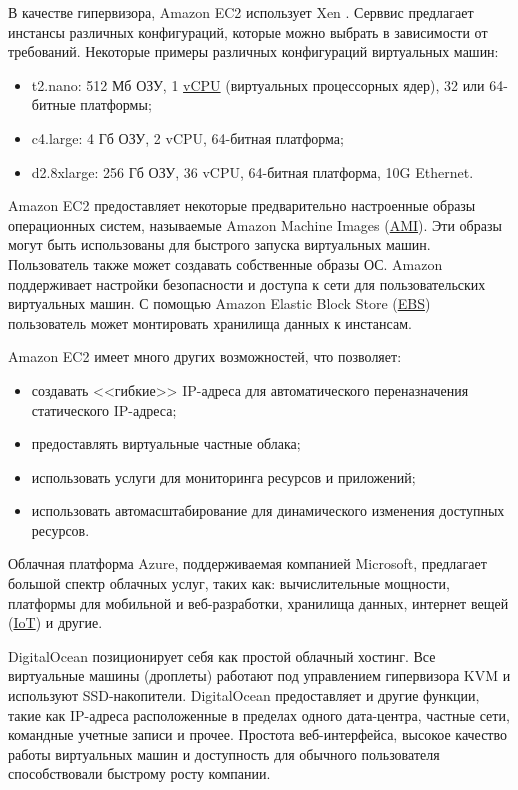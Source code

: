 
В качестве гипервизора, Amazon EC2 использует Xen \cite{xen}.
Серввис предлагает инстансы различных конфигураций, которые можно выбрать в зависимости от требований.
Некоторые примеры различных конфигураций виртуальных машин:
\begin{itemize}
  \item t2.nano: 512 Мб ОЗУ, 1 \hyperlink{vcpu}{vCPU} (виртуальных процессорных ядер), 32 или 64-битные платформы;
  \item c4.large: 4 Гб ОЗУ, 2 vCPU, 64-битная платформа;
  \item d2.8xlarge: 256 Гб ОЗУ, 36 vCPU, 64-битная платформа, 10G Ethernet.
\end{itemize}

Amazon EC2 предоставляет некоторые предварительно настроенные образы операционных систем, называемые Amazon Machine Images (\hyperlink{ami}{AMI}).
Эти образы могут быть использованы для быстрого запуска виртуальных машин.
Пользователь также может создавать собственные образы ОС.
Amazon поддерживает настройки безопасности и доступа к сети для пользовательских виртуальных машин.
С помощью Amazon Elastic Block Store (\hyperlink{ebs}{EBS}) пользователь может монтировать хранилища данных к инстансам.

Amazon EC2 имеет много других возможностей, что позволяет:
\begin{itemize}
  \item создавать <<гибкие>> IP-адреса для автоматического переназначения статического IP-адреса;
  \item предоставлять виртуальные частные облака;
  \item использовать услуги для мониторинга ресурсов и приложений;
  \item использовать автомасштабирование для динамического изменения доступных ресурсов.
\end{itemize}

Облачная платформа Azure, поддерживаемая компанией Microsoft, предлагает большой спектр облачных услуг, таких как: вычислительные мощности, платформы для мобильной и веб-разработки, хранилища данных, интернет вещей (\hyperlink{iot}{IoT}) и другие.

DigitalOcean позиционирует себя как простой облачный хостинг.
Все виртуальные машины (дроплеты) работают под управлением гипервизора KVM и используют SSD-накопители.
DigitalOcean предоставляет и другие функции, такие как IP-адреса расположенные в пределах одного дата-центра, частные сети, командные учетные записи и прочее.
Простота веб-интерфейса, высокое качество работы виртуальных машин и доступность для обычного пользователя способствовали быстрому росту компании.

